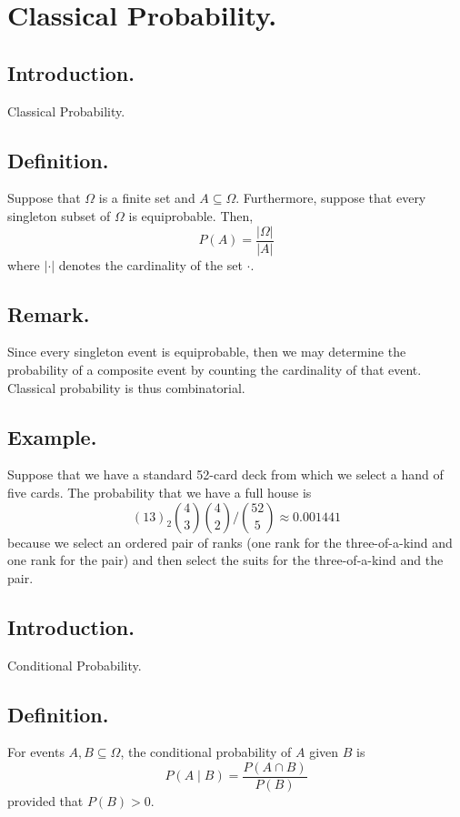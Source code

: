 \documentclass[titlepage]{article}
\begin{document}
\newpage \section{Classical Probability.}

\subsection{Introduction.} Classical Probability.

\subsection{Definition.} Suppose that $\Omega$ is a finite set and $A \subseteq \Omega$. Furthermore, suppose that every singleton subset of $\Omega$ is equiprobable. Then, 
$$P(A) = \frac{|\Omega|}{|A|}$$
where $|\cdot|$ denotes the cardinality of the set $\cdot$.

\subsection{Remark.} Since every singleton event is equiprobable, then we may determine the probability of a composite event by counting the cardinality of that event. Classical probability is thus combinatorial.

\subsection{Example.} Suppose that we have a standard 52-card deck from which we select a hand of five cards. The probability that we have a full house is 
$$(13)_{2}\binom{4}{3}\binom{4}{2} / \binom{52}{5} \approx 0.001441$$
because we select an ordered pair of ranks (one rank for the three-of-a-kind and one rank for the pair) and then select the suits for the three-of-a-kind and the pair.

\newpage {}

\subsection{Introduction.} Conditional Probability.

\subsection{Definition.} For events $A, B \subseteq \Omega$, the conditional probability of $A$ given $B$ is 
$$P(A \mid B) = \frac{P(A \cap B)}{P(B)}$$
provided that $P(B) > 0$.
\end{document}
